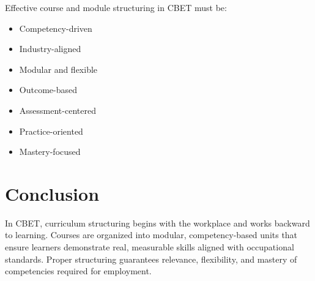 \documentclass[12pt]{article}
\begin{document}
Effective course and module structuring in CBET must be:

\begin{itemize}
    \item Competency-driven
    \item Industry-aligned
    \item Modular and flexible
    \item Outcome-based
    \item Assessment-centered
    \item Practice-oriented
    \item Mastery-focused
\end{itemize}

\section{Conclusion}

In CBET, curriculum structuring begins with the workplace and works backward to learning. Courses are organized into modular, competency-based units that ensure learners demonstrate real, measurable skills aligned with occupational standards. Proper structuring guarantees relevance, flexibility, and mastery of competencies required for employment.
\end{document}
